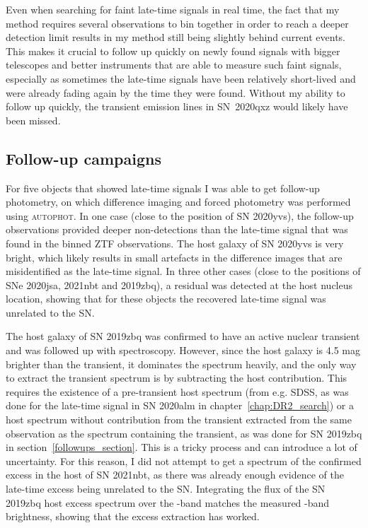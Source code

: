\documentclass[a4paper,oneside,12pt, class=Latex/Classes/PhDthesisPSnPDF, crop=false]{standalone}
\begin{document}
Even when searching for faint late-time signals in real time, the fact that my method requires several observations to bin together in order to reach a deeper detection limit results in my method still being slightly behind current events. This makes it crucial to follow up quickly on newly found signals with bigger telescopes and better instruments that are able to measure such faint signals, especially as sometimes the late-time signals have been relatively short-lived and were already fading again by the time they were found. Without my ability to follow up quickly, the transient emission lines in SN~2020qxz would likely have been missed.


\subsection{Follow-up campaigns}
For five objects that showed late-time signals I was able to get follow-up photometry, on which difference imaging and forced photometry was performed using \textsc{autophot}. In one case (close to the position of SN 2020yvs), the follow-up observations provided deeper non-detections than the late-time signal that was found in the binned ZTF observations. The host galaxy of SN 2020yvs is very bright, which likely results in small artefacts in the difference images that are misidentified as the late-time signal. In three other cases (close to the positions of SNe 2020jsa, 2021nbt and 2019zbq), a residual was detected at the host nucleus location, showing that for these objects the recovered late-time signal was unrelated to the SN.

The host galaxy of SN 2019zbq was confirmed to have an active nuclear transient and was followed up with spectroscopy. However, since the host galaxy is 4.5 mag brighter than the transient, it dominates the spectrum heavily, and the only way to extract the transient spectrum is by subtracting the host contribution. This requires the existence of a pre-transient host spectrum (from e.g. SDSS, as was done for the late-time signal in SN 2020alm in chapter~\ref{chap:DR2_search}) or a host spectrum without contribution from the transient extracted from the same observation as the spectrum containing the transient, as was done for SN 2019zbq in section~\ref{followups_section}. This is a tricky process and can introduce a lot of uncertainty. For this reason, I did not attempt to get a spectrum of the confirmed excess in the host of SN 2021nbt, as there was already enough evidence of the late-time excess being unrelated to the SN. Integrating the flux of the SN 2019zbq host excess spectrum over the \ztfr-band matches the measured \ztfr-band brightness, showing that the excess extraction has worked.
\end{document}
